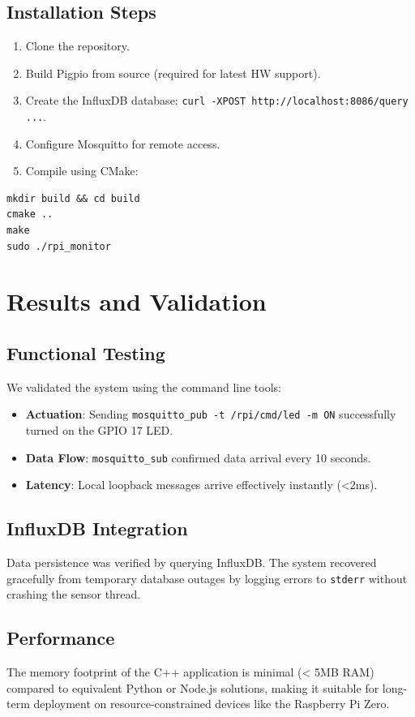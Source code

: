 \documentclass[12pt, a4paper]{article}
\begin{document}
\subsection{Installation Steps}
\begin{enumerate}
    \item Clone the repository.
    \item Build Pigpio from source (required for latest HW support).
    \item Create the InfluxDB database: \texttt{curl -XPOST http://localhost:8086/query ...}.
    \item Configure Mosquitto for remote access.
    \item Compile using CMake:
\end{enumerate}

\begin{verbatim}
mkdir build && cd build
cmake ..
make
sudo ./rpi_monitor
\end{verbatim}

\newpage

\section{Results and Validation}

\subsection{Functional Testing}
We validated the system using the command line tools:
\begin{itemize}
    \item \textbf{Actuation}: Sending \texttt{mosquitto\_pub -t /rpi/cmd/led -m ON} successfully turned on the GPIO 17 LED.
    \item \textbf{Data Flow}: \texttt{mosquitto\_sub} confirmed data arrival every 10 seconds.
    \item \textbf{Latency}: Local loopback messages arrive effectively instantly (<2ms).
\end{itemize}

\subsection{InfluxDB Integration}
Data persistence was verified by querying InfluxDB. The system recovered gracefully from temporary database outages by logging errors to \texttt{stderr} without crashing the sensor thread.

\subsection{Performance}
The memory footprint of the C++ application is minimal (< 5MB RAM) compared to equivalent Python or Node.js solutions, making it suitable for long-term deployment on resource-constrained devices like the Raspberry Pi Zero.
\end{document}
